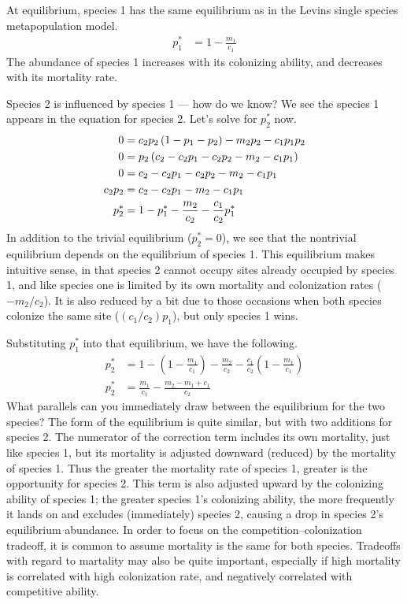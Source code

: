  At equilibrium, species 1 has the same equilibrium as in the Levins single species metapopulation model.
\begin{align}
  \label{eq:3}
  p_1^*&=1-\frac{m_1}{c_1}
\end{align}
The abundance of species 1 increases with its colonizing ability, and decreases with its mortality rate. 

Species 2 is influenced by species 1 --- how do we know? We see the species 1 appears in the equation for species 2. Let's solve for $p_2^*$ now. 
\begin{align}
  \label{eq:4}
  0 &= c_2p_2\left(1-p_1-p_2\right) - m_2p_2 - c_1p_1p_2\notag\\
  0 &= p_2\left(c_2-c_2p_1 - c_2p_2 - m_2 - c_1p_1\right)\notag\\
  0 &= c_2 - c_2p_1 - c_2p_2 - m_2 - c_1p_1\notag\\
  c_2p_2 &= c_2  - c_2p_1 - m_2 - c_1p_1\notag\\
  p_2^* &= 1  - p_1^* -  \frac{m_2}{c_2} - \frac{c_1}{c_2}p_1^*\\
\end{align}
In addition to the trivial equilibrium ($p_2^*=0$), we see that the nontrivial equilibrium depends on the equilibrium of species 1. This equilibrium makes intuitive sense, in that species 2 cannot occupy sites already occupied by species 1, and like species one is limited by its own mortality and colonization rates ($-m_2/c_2$). It is also reduced by a bit due to those occasions when both species colonize the same site ($(c_1/c_2)p_1$), but only species 1 wins. 

Substituting $p_1^*$ into that equilibrium, we have the following.
\begin{align}
  \label{eq:5}
  p_2^* &= 1  - \left(1-\frac{m_1}{c_1}\right) - \frac{m_2}{c_2} -  \frac{c_1}{c_2} \left(1 - \frac{m_1}{c_1} \right)\\
  p_2^* &= \frac{m_1}{c_1} - \frac{m_2 - m_1 + c_1}{c_2}\label{eq:eq2}
\end{align}
What parallels can you immediately draw between the equilibrium for the two species? The form of the equilibrium is quite similar, but with two additions for species 2. The numerator of the correction term includes its own mortality, just like species 1, but its mortality is adjusted downward (reduced) by the mortality of species 1. Thus the greater the mortality rate of species 1, greater is the opportunity for species 2. This term is also adjusted upward by the colonizing ability of species 1; the greater species 1's colonizing ability, the more frequently it lands on and excludes (immediately) species 2, causing a drop in species 2's equilibrium abundance. In order to focus on the competition--colonization tradeoff, it is common to assume mortality is the same for both species. Tradeoffs with regard to martality may also be quite important, especially if high mortality is correlated with high colonization rate, and negatively correlated with competitive ability.

